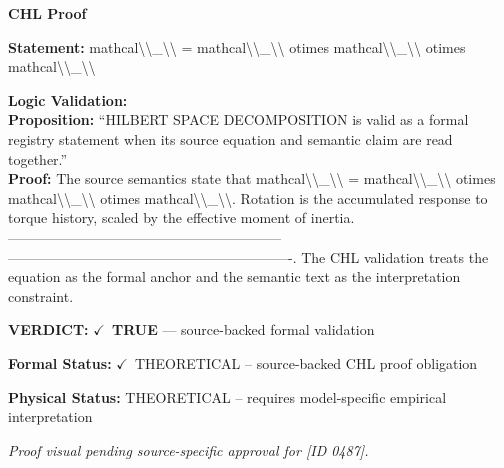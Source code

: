 \vspace{0.45em}
\noindent\textbf{CHL Proof}\par
\textbf{Statement:} mathcal\textbackslash{}\textbackslash{}\_\textbackslash{}\textbackslash{} = mathcal\textbackslash{}\textbackslash{}\_\textbackslash{}\textbackslash{} otimes mathcal\textbackslash{}\textbackslash{}\_\textbackslash{}\textbackslash{} otimes mathcal\textbackslash{}\textbackslash{}\_\textbackslash{}\textbackslash{}

\textbf{Logic Validation:}\\
\textbf{Proposition:} ``HILBERT SPACE DECOMPOSITION is valid as a formal registry statement when its source
equation and semantic claim are read together.''\\
\textbf{Proof:} The source semantics state that mathcal\textbackslash{}\textbackslash{}\_\textbackslash{}\textbackslash{} = mathcal\textbackslash{}\textbackslash{}\_\textbackslash{}\textbackslash{} otimes mathcal\textbackslash{}\textbackslash{}\_\textbackslash{}\textbackslash{} otimes
mathcal\textbackslash{}\textbackslash{}\_\textbackslash{}\textbackslash{}. Rotation is the accumulated response to torque history, scaled by the
effective moment of inertia. -----------------------------------------------------------
-------------------------------------------------------------. The CHL validation treats
the equation as the formal anchor and the semantic text as the interpretation
constraint.

\textbf{VERDICT:} \ensuremath{\checkmark}\ \textbf{TRUE} --- source-backed formal validation

\textbf{Formal Status:} \ensuremath{\checkmark}\ THEORETICAL -- source-backed CHL proof obligation

\textbf{Physical Status:} THEORETICAL -- requires model-specific empirical interpretation
\par\vspace{0.45em}
\par
\vfill
\begingroup\footnotesize\itshape
Proof visual pending source-specific approval for [ID 0487].
\par\endgroup
\vfill
\endgroup
\endgroup

